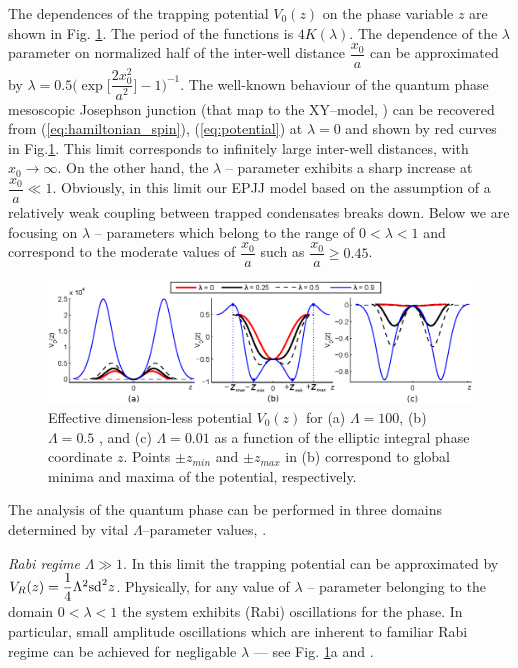 \documentclass[aps, pre, preprint, groupedaddress, superscriptaddress, showkeys, showpacs] {revtex4-1}
\begin{document}
The dependences of the trapping potential $V_0(z)$ on the phase variable $z$ are shown in Fig. \ref{phase_potential}. The period of the functions is  $4K(\lambda)$.
The dependence of the $\lambda$ parameter on normalized half of the inter-well distance $\dfrac{x_0}{a}$ can be approximated by $\lambda = 0.5 \Big( \exp \Big[ \dfrac{2 x_0^2}{a^2} \Big] - 1 \Big)^{-1}$.
The well-known behaviour of the quantum phase mesoscopic Josephson junction (that map to the XY--model, \citep{Lago1, Lago2} ) can be recovered from (\ref{eq:hamiltonian_spin}), (\ref{eq:potential}) at $\lambda = 0$ and shown by red curves in  Fig.\ref{phase_potential}. This limit corresponds to  infinitely large inter-well distances, with $x_0 \to \infty$.
On the other hand, the $\lambda$ -- parameter exhibits a sharp increase at $\dfrac{x_0}{a} \ll 1$.
Obviously, in this limit our EPJJ model based on the assumption of a relatively weak coupling between trapped condensates breaks down.
Below we are focusing on $\lambda$ -- parameters which belong to the range of $0 < \lambda < 1$ and correspond to the moderate values of $\dfrac{x_0}{a}$ such as $\dfrac{x_0}{a} \geq 0.45$. 
%
\begin{figure}[ht]
\begin{center}\includegraphics[width=1\linewidth]{pic/potentials.eps}
\end{center}
\caption{
Effective dimension-less potential $V_0(z)$ for (a) $\Lambda = 100$, (b) $\Lambda = 0.5$ , and (c) $\Lambda = 0.01$ as a function of the elliptic integral phase coordinate $z$.
Points $\pm z_{min}$ and $\pm z_{max}$ in (b) correspond to global minima and maxima of the potential, respectively. \label{phase_potential}}
\end{figure}
%
The analysis of the quantum phase can be performed in three domains determined by vital $\Lambda$--parameter values, \cite{Anglin}.

\textit{Rabi regime} $\Lambda \gg 1$. In this limit the trapping potential can be approximated by $V_R(z) = \dfrac{1}{4} \Lambda^2 \textrm{sd}^2{z}$.
Physically, for any value of $\lambda$ -- parameter belonging to the domain 0$<\lambda <1$ the system exhibits (Rabi) oscillations for the phase.
In particular, small amplitude oscillations which are inherent to familiar Rabi regime can be achieved for negligable $\lambda$ --- see Fig. \ref{phase_potential}a and \cite{Anglin}.
\end{document}
